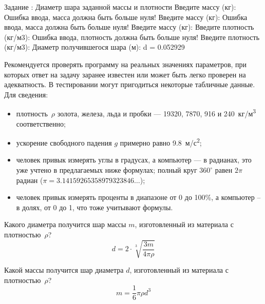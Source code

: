 \begin{zzoutput}
  Задание : Диаметр шара заданной массы и плотности
  Введите массу (кг): 
  Ошибка ввода, масса должна быть больше нуля!
  Введите массу (кг): 
  Ошибка ввода, масса должна быть больше нуля!
  Введите массу (кг): 
  Введите плотность (кг/м3): 
  Ошибка ввода, плотность должна быть больше нуля!
  Введите плотность (кг/м3): 
  Диаметр получившегося шара (м): d = 0.052929
\end{zzoutput}
 
Рекомендуется проверять программу на реальных значениях параметров, при
которых ответ на задачу заранее известен или может быть легко проверен на
адекватность. В тестировании могут пригодиться некоторые табличные данные.
Для сведения:
%
\begin{itemize}
%
\item плотность~$\rho$ золота, железа, льда и пробки ---
19320, 7870, 916 и 240~кг/м\textsuperscript{3} соответственно;
%
\item ускорение свободного падения $g$ примерно равно 
9.8~м/с\textsuperscript{2};
%
\item человек привык измерять углы в градусах, а компьютер ---
в радианах, это уже учтено в предлагаемых ниже формулах;
полный круг $360^{\circ}$ равен $2\pi$ радиан ($\pi = 3.14159265358979323846\dots$);
%
\item человек привык измерять проценты в диапазоне от 0 до 100\%,
а компьютер -- в долях, от 0 до 1, что тоже учитывают формулы.
\end{itemize}


\bigskip


\begin{zztask} 
Какого диаметра получится шар массы $m$, изготовленный из материала с
плотностью~$\rho$?
%
\[
d = 2\cdot \sqrt[3]{\frac{3m}{4\pi\rho}}
\]
\end{zztask}


\begin{zztask}
Какой массы получится шар диаметра $d$, изготовленный из материала с
плотностью~$\rho$?
%
\[
m = \frac{1}{6}\pi\rho d^3
\]
\end{zztask}

